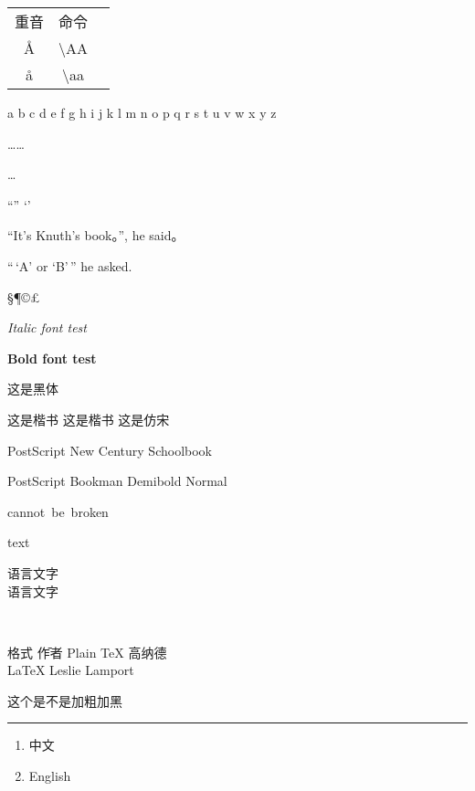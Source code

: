 \documentclass[UTF8]{ctexart}
\begin{document}
\begin{table}[H]
\begin{tabular}{|ccc|}
\hline 

重音& 命令& \\
\AA & \textbackslash AA & \\
\aa & \textbackslash aa & \\
\hline

\end{tabular}
\end{table}
\textgreek{a b c d e f g h i j k l m n o p q r s t u v w x y z}

……

\ldots

``''
`'

``It's Knuth's book。'', he said。

``\,`A' or `B'\,'' he asked.

\S  \dag  \ddag  \P  \copyright  \textregistered  \texttrademark  \pounds  \textbullet

\textit{Italic font test}

{\bfseries Bold font test}

{这是黑体}

{这是楷书}
{\kaishu 这是楷书}
{\fangsong 这是仿宋}

PostScript New Century Schoolbook

PostScript Bookman Demibold Normal

\mbox{cannot be broken}

\makebox[1em]{\textbullet} text \\

语言文字\\
语言文字

\\

\begin{tabbing}
格式 \hspace{3em} \= 作者 \kill
Plain \TeX \> 高纳德 \\
\LaTeX \> Leslie Lamport
\end{tabbing}
这个是不是加粗加黑
\rule{1em}{1em}

\begin{enumerate}
\item 中文
\item English
\end{enumerate}
\end{document}
